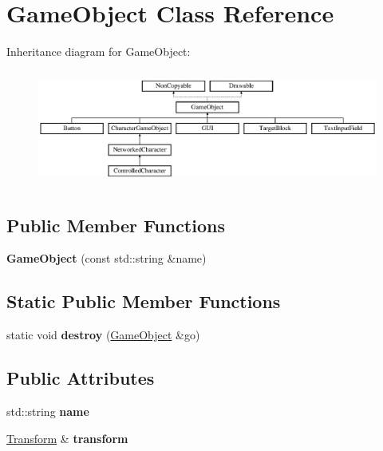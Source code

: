 \hypertarget{class_game_object}{\section{Game\-Object Class Reference}
\label{class_game_object}
}
Inheritance diagram for Game\-Object\-:\begin{figure}[H]
\begin{center}
\leavevmode
\includegraphics[height=3.835616cm]{class_game_object}
\end{center}
\end{figure}
\subsection*{Public Member Functions}
\begin{DoxyCompactItemize}
\item 
\hypertarget{class_game_object_a1e50d4cace9d1d2c12bfd4f73f43d089}{{\bfseries Game\-Object} (const std\-::string \&name)}\label{class_game_object_a1e50d4cace9d1d2c12bfd4f73f43d089}

\end{DoxyCompactItemize}
\subsection*{Static Public Member Functions}
\begin{DoxyCompactItemize}
\item 
\hypertarget{class_game_object_a95df6d5712b6de96dae66a26d72bb0df}{static void {\bfseries destroy} (\hyperlink{class_game_object}{Game\-Object} \&go)}\label{class_game_object_a95df6d5712b6de96dae66a26d72bb0df}

\end{DoxyCompactItemize}
\subsection*{Public Attributes}
\begin{DoxyCompactItemize}
\item 
\hypertarget{class_game_object_af542b33c8de269343e22c5629e6b66c0}{std\-::string {\bfseries name}}\label{class_game_object_af542b33c8de269343e22c5629e6b66c0}

\item 
\hypertarget{class_game_object_a104598c64b16c88712b0bec6e669ecf0}{\hyperlink{class_transform}{Transform} \& {\bfseries transform}}\label{class_game_object_a104598c64b16c88712b0bec6e669ecf0}

\end{DoxyCompactItemize}
